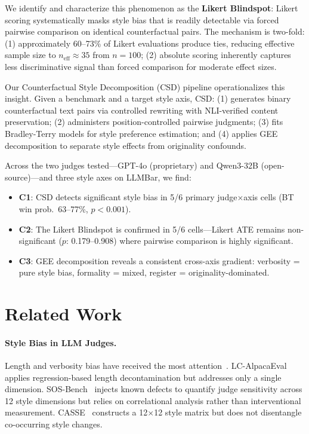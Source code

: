 \documentclass[11pt,a4paper]{article}
\begin{document}
We identify and characterize this phenomenon as the \textbf{Likert Blindspot}: Likert scoring systematically masks style bias that is readily detectable via forced pairwise comparison on identical counterfactual pairs. The mechanism is two-fold: (1) approximately 60--73\% of Likert evaluations produce ties, reducing effective sample size to $n_{\text{eff}} \approx 35$ from $n=100$; (2) absolute scoring inherently captures less discriminative signal than forced comparison for moderate effect sizes.

Our Counterfactual Style Decomposition (CSD) pipeline operationalizes this insight. Given a benchmark and a target style axis, CSD: (1) generates binary counterfactual text pairs via controlled rewriting with NLI-verified content preservation; (2) administers position-controlled pairwise judgments; (3) fits Bradley-Terry models for style preference estimation; and (4) applies GEE decomposition to separate style effects from originality confounds.

Across the two judges tested---GPT-4o (proprietary) and Qwen3-32B (open-source)---and three style axes on LLMBar, we find:
\begin{itemize}
\item \textbf{C1}: CSD detects significant style bias in 5/6 primary judge$\times$axis cells (BT win prob.\ 63--77\%, $p < 0.001$).
\item \textbf{C2}: The Likert Blindspot is confirmed in 5/6 cells---Likert ATE remains non-significant ($p$: 0.179--0.908) where pairwise comparison is highly significant.
\item \textbf{C3}: GEE decomposition reveals a consistent cross-axis gradient: verbosity = pure style bias, formality = mixed, register = originality-dominated.
\end{itemize}

\section{Related Work}

\paragraph{Style Bias in LLM Judges.}
Length and verbosity bias have received the most attention~\cite{wu2024style,dubois2024length}. LC-AlpacaEval~\cite{dubois2024length} applies regression-based length decontamination but addresses only a single dimension. SOS-Bench~\cite{ye2024sosbench} injects known defects to quantify judge sensitivity across 12 style dimensions but relies on correlational analysis rather than interventional measurement. CASSE~\cite{song2024casse} constructs a 12$\times$12 style matrix but does not disentangle co-occurring style changes.
\end{document}
